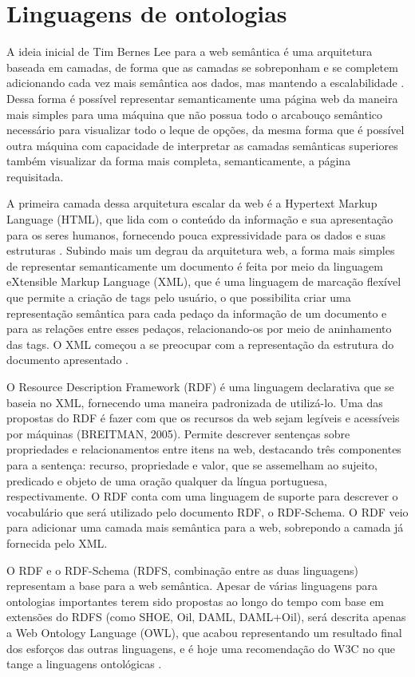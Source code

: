 \section{Linguagens de ontologias}

A ideia inicial de Tim Bernes Lee para a web semântica é uma arquitetura baseada em
camadas, de forma que as camadas se sobreponham e se completem adicionando cada vez
mais semântica aos dados, mas mantendo a escalabilidade \cite{breitman05}. Dessa forma
é possível representar semanticamente uma página web da maneira mais simples para uma
máquina que não possua todo o arcabouço semântico necessário para visualizar todo o leque
de opções, da mesma forma que é possível outra máquina com capacidade de interpretar as
camadas semânticas superiores também visualizar da forma mais completa, semanticamente,
a página requisitada.

A primeira camada dessa arquitetura escalar da web é a Hypertext Markup Language
(HTML), que lida com o conteúdo da informação e sua apresentação para os seres humanos,
fornecendo pouca expressividade para os dados e suas estruturas \cite{breitman05}.
Subindo mais um degrau da arquitetura web, a forma mais simples de representar
semanticamente um documento é feita por meio da linguagem eXtensible Markup Language
(XML), que é uma linguagem de marcação flexível que permite a criação de tags pelo
usuário, o que possibilita criar uma representação semântica para cada pedaço da informação
de um documento e para as relações entre esses pedaços, relacionando-os por meio de
aninhamento das tags. O XML começou a se preocupar com a representação da estrutura do
documento apresentado \cite{breitman05}.

O Resource Description Framework (RDF) é uma linguagem declarativa que se baseia
no XML, fornecendo uma maneira padronizada de utilizá-lo. Uma das propostas do RDF é
fazer com que os recursos da web sejam legíveis e acessíveis por máquinas (BREITMAN,
2005). Permite descrever sentenças sobre propriedades e relacionamentos entre itens na web,
destacando três componentes para a sentença: recurso, propriedade e valor, que se
assemelham ao sujeito, predicado e objeto de uma oração qualquer da língua portuguesa,
respectivamente. O RDF conta com uma linguagem de suporte para descrever o vocabulário
que será utilizado pelo documento RDF, o RDF-Schema. O RDF veio para adicionar uma
camada mais semântica para a web, sobrepondo a camada já fornecida pelo XML.

O RDF e o RDF-Schema (RDFS, combinação entre as duas linguagens) representam a
base para a web semântica. Apesar de várias linguagens para ontologias importantes terem
sido propostas ao longo do tempo com base em extensões do RDFS (como SHOE, Oil,
DAML, DAML+Oil), será descrita apenas a Web Ontology Language (OWL), que acabou
representando um resultado final dos esforços das outras linguagens, e é hoje uma
recomendação do W3C no que tange a linguagens ontológicas \cite{breitman05}.

